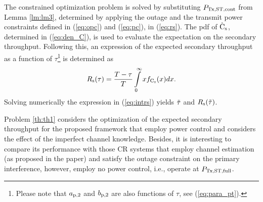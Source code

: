 \begin{IEEEproof}
The constrained optimization problem is solved by substituting $P_{\text{Tx,ST,cont}}$ from Lemma \ref{lm:lm3}, determined by applying the outage and the transmit power constraints defined in (\ref{eq:opc}) and (\ref{eq:pc}), in (\ref{eq:rs}). 
The pdf of $\hat{\text{{C}}}_{\text{s}}$, determined in (\ref{eq:den_C}), is used to evaluate the expectation on the secondary throughput. Following this, an expression of the expected secondary throughput as a function of $\tau$\footnote{Please note that $a_{\text{p,2}}$ and $b_{\text{p,2}}$ are also functions of $\tau$, see (\ref{eq:para_pt}).} is determined as
\begin{equation}
R_{\text{s}}(\tau) = \frac{T - \tau}{T} \int\limits_{0}^{\infty} x f_{\text{C}_{\text{s}}}(x) dx. \label{eq:intrs}
\end{equation}
Solving numerically the expression in (\ref{eq:intrs}) yields $\tilde{\tau}$ and $R_{\text{s}}(\tilde{\tau})$. 
\end{IEEEproof}
\begin{coro} \label{cor:cor2}
\normalfont
Problem \ref{th:th1} considers the optimization of the expected secondary throughput for the proposed framework that employ power control and considers the effect of the imperfect channel knowledge.  Besides, it is interesting to compare its performance with those CR systems that employ channel estimation (as proposed in the paper) and satisfy the outage constraint on the primary interference, however, employ no power control, i.e., operate at $P_{\text{Tx,ST,full}}$. 
\end{coro}


